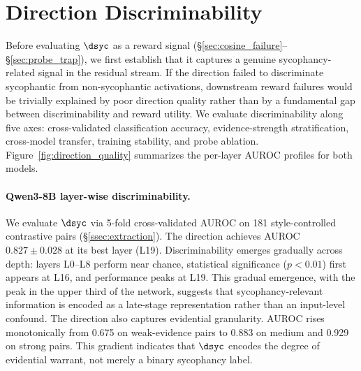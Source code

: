 \section{Direction Discriminability}
\label{sec:direction_quality}

Before evaluating $\dsyc$ as a reward signal (\S\ref{sec:cosine_failure}--\S\ref{sec:probe_trap}), we first establish that it captures a genuine sycophancy-related signal in the residual stream.
If the direction failed to discriminate sycophantic from non-sycophantic activations, downstream reward failures would be trivially explained by poor direction quality rather than by a fundamental gap between discriminability and reward utility.
We evaluate discriminability along five axes: cross-validated classification accuracy, evidence-strength stratification, cross-model transfer, training stability, and probe ablation.
Figure~\ref{fig:direction_quality} summarizes the per-layer AUROC profiles for both models.

\paragraph{Qwen3-8B layer-wise discriminability.}
We evaluate $\dsyc$ via 5-fold cross-validated AUROC on 181 style-controlled contrastive pairs (\S\ref{ssec:extraction}).
The direction achieves AUROC $0.827 \pm 0.028$ at its best layer (L19).
Discriminability emerges gradually across depth: layers L0--L8 perform near chance, statistical significance ($p < 0.01$) first appears at L16, and performance peaks at L19.
This gradual emergence, with the peak in the upper third of the network, suggests that sycophancy-relevant information is encoded as a late-stage representation rather than an input-level confound.
The direction also captures evidential granularity.
AUROC rises monotonically from 0.675 on weak-evidence pairs to 0.883 on medium and 0.929 on strong pairs.
This gradient indicates that $\dsyc$ encodes the degree of evidential warrant, not merely a binary sycophancy label.


